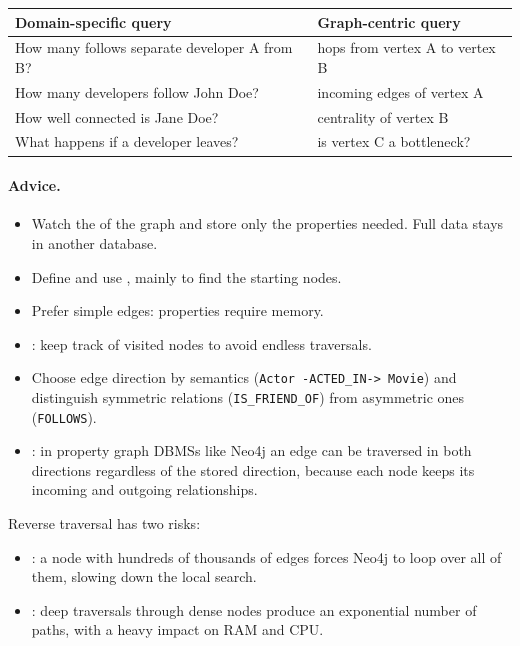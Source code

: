\begin{center}\small
\begin{tabular}{p{6.9cm}p{6.7cm}}
\toprule
\textbf{Domain-specific query} & \textbf{Graph-centric query} \\
\midrule
How many follows separate developer A from B? & hops from vertex A to vertex B \\
How many developers follow John Doe? & incoming edges of vertex A \\
How well connected is Jane Doe? & centrality of vertex B \\
What happens if a developer leaves? & is vertex C a bottleneck? \\
\bottomrule
\end{tabular}
\end{center}

\paragraph{Advice.}
\begin{itemize}
  \item Watch the  of the graph and store only the properties needed. Full data stays in another database.
  \item Define and use , mainly to find the starting nodes.
  \item Prefer simple edges: properties require memory.
  \item {}: keep track of visited nodes to avoid endless traversals.
  \item Choose edge direction by semantics (\texttt{Actor -ACTED\_IN-> Movie}) and distinguish symmetric relations (\texttt{IS\_FRIEND\_OF}) from asymmetric ones (\texttt{FOLLOWS}).
  \item {}: in property graph DBMSs like Neo4j an edge can be traversed in both directions regardless of the stored direction, because each node keeps its incoming and outgoing relationships.
\end{itemize}

Reverse traversal has two risks:
\begin{itemize}
  \item {}: a node with hundreds of thousands of edges forces Neo4j to loop over all of them, slowing down the local search.
  \item {}: deep traversals through dense nodes produce an exponential number of paths, with a heavy impact on RAM and CPU.
\end{itemize}

